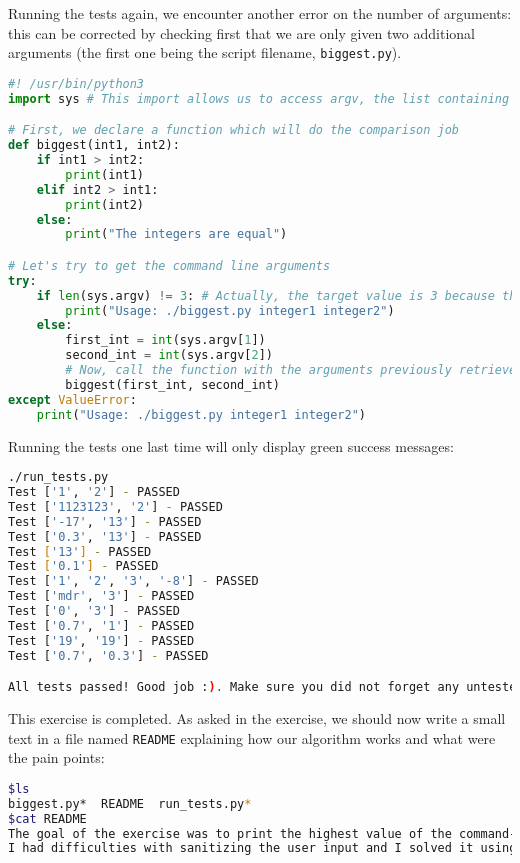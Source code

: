 \documentclass[12pt]{article}
\begin{document}
Running the tests again, we encounter another error on the number of arguments: this can be corrected by checking first that we are only given two additional arguments (the first one being the script filename, \texttt{biggest.py}).

\begin{lstlisting}[style=codestyle,language=python,title=biggest.py]
#! /usr/bin/python3
import sys # This import allows us to access argv, the list containing the command line arguments

# First, we declare a function which will do the comparison job
def biggest(int1, int2):
    if int1 > int2:
        print(int1)
    elif int2 > int1:
        print(int2)
    else:
        print("The integers are equal")

# Let's try to get the command line arguments
try:
    if len(sys.argv) != 3: # Actually, the target value is 3 because the first element of argv is always the name of the script
        print("Usage: ./biggest.py integer1 integer2")
    else:
        first_int = int(sys.argv[1])
        second_int = int(sys.argv[2])
        # Now, call the function with the arguments previously retrieved
        biggest(first_int, second_int)
except ValueError:
    print("Usage: ./biggest.py integer1 integer2")
\end{lstlisting}

Running the tests one last time will only display green success messages:
\begin{lstlisting}[language=bash]
./run_tests.py 
Test ['1', '2'] - PASSED
Test ['1123123', '2'] - PASSED
Test ['-17', '13'] - PASSED
Test ['0.3', '13'] - PASSED
Test ['13'] - PASSED
Test ['0.1'] - PASSED
Test ['1', '2', '3', '-8'] - PASSED
Test ['mdr', '3'] - PASSED
Test ['0', '3'] - PASSED
Test ['0.7', '1'] - PASSED
Test ['19', '19'] - PASSED
Test ['0.7', '0.3'] - PASSED

All tests passed! Good job :). Make sure you did not forget any untested behavior
\end{lstlisting}

This exercise is completed. As asked in the exercise, we should now write a small text in a file named \texttt{README} explaining how our algorithm works and what were the pain points:

\begin{lstlisting}[language=bash]
$ls
biggest.py*  README  run_tests.py*
$cat README
The goal of the exercise was to print the highest value of the command-line arguments.
I had difficulties with sanitizing the user input and I solved it using type casting and by checking the number of arguments in argv.
\end{lstlisting}
\end{document}
